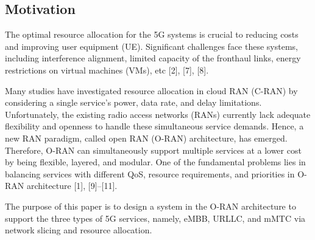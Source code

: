 \documentclass[12pt, letterpaper]{article}
\begin{document}
\subsection{Motivation}
The optimal resource allocation for the 5G systems is crucial to reducing costs and improving user equipment (UE). Significant challenges face these systems, including interference alignment, limited capacity of the fronthaul links, energy restrictions on virtual machines (VMs), etc [2], [7], [8].

Many studies have investigated resource allocation in cloud RAN (C-RAN) by considering a single service's power, data rate, and delay limitations.
Unfortunately, the existing radio access networks (RANs) currently lack adequate flexibility and openness to handle these simultaneous service demands. 
Hence, a new RAN paradigm, called open RAN (O-RAN) architecture, has emerged.
Therefore, O-RAN can simultaneously support multiple services at a lower cost by being flexible, layered, and modular.  
One of the fundamental problems lies in balancing services with different QoS, resource requirements, and priorities in O-RAN architecture [1], [9]–[11]. 

The purpose of this paper is to design a system in the O-RAN architecture to support the three types of 5G services, namely, eMBB, URLLC, and mMTC via network slicing and resource allocation.
\end{document}
